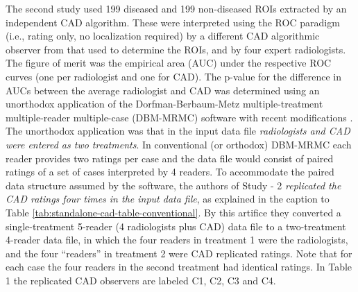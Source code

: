 \documentclass[
]{book}
\begin{document}
The second study \citep{kooi2016comparison} used 199 diseased and 199 non-diseased ROIs extracted by an independent CAD algorithm. These were interpreted using the ROC paradigm (i.e., rating only, no localization required) by a different CAD algorithmic observer from that used to determine the ROIs, and by four expert radiologists. The figure of merit was the empirical area (AUC) under the respective ROC curves (one per radiologist and one for CAD). The p-value for the difference in AUCs between the average radiologist and CAD was determined using an unorthodox application of the Dorfman-Berbaum-Metz \citep{dorfman1992receiver} multiple-treatment multiple-reader multiple-case (DBM-MRMC) software with recent modifications \citep{hillis2008recent}. The unorthodox application was that in the input data file \emph{radiologists and CAD were entered as two treatments}. In conventional (or orthodox) DBM-MRMC each reader provides two ratings per case and the data file would consist of paired ratings of a set of cases interpreted by 4 readers. To accommodate the paired data structure assumed by the software, the authors of Study - 2 \emph{replicated the CAD ratings four times in the input data file}, as explained in the caption to Table \ref{tab:standalone-cad-table-conventional}. By this artifice they converted a single-treatment 5-reader (4 radiologists plus CAD) data file to a two-treatment 4-reader data file, in which the four readers in treatment 1 were the radiologists, and the four ``readers'' in treatment 2 were CAD replicated ratings. Note that for each case the four readers in the second treatment had identical ratings. In Table 1 the replicated CAD observers are labeled C1, C2, C3 and C4.
\end{document}

